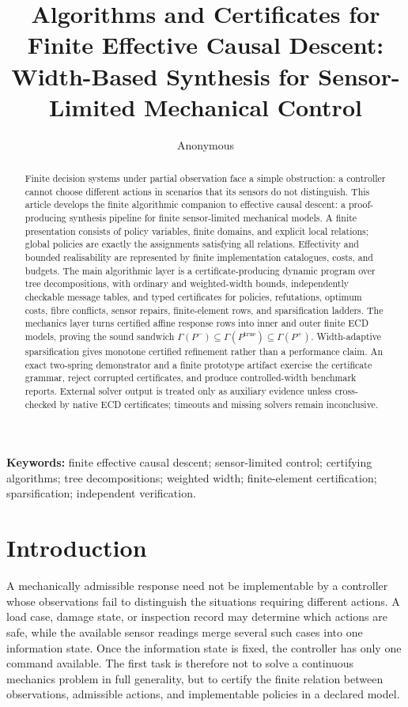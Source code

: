 \documentclass[11pt]{article}
\title{Algorithms and Certificates for Finite Effective Causal Descent:\\
Width-Based Synthesis for Sensor-Limited Mechanical Control}
\author{Anonymous}
\date{}
\theoremstyle{plain}
\theoremstyle{definition}
\theoremstyle{remark}
\begin{document}
\maketitle

\begin{abstract}
Finite decision systems under partial observation face a simple obstruction: a
controller cannot choose different actions in scenarios that its sensors do not
distinguish.  This article develops the finite algorithmic companion to
effective causal descent: a proof-producing synthesis pipeline for finite
sensor-limited mechanical models.  A finite presentation consists of policy variables, finite domains, and
explicit local relations; global policies are exactly the assignments satisfying
all relations.  Effectivity and bounded realisability are represented by finite
implementation catalogues, costs, and budgets.  The main algorithmic layer is a
certificate-producing dynamic program over tree decompositions, with ordinary
and weighted-width bounds, independently checkable message tables, and typed
certificates for policies, refutations, optimum costs, fibre conflicts, sensor
repairs, finite-element rows, and sparsification ladders.  The mechanics layer
turns certified affine response rows into inner and outer finite ECD models,
proving the sound sandwich
\(\Gamma(P^-)\subseteq\Gamma(P^{\mathrm{true}})\subseteq\Gamma(P^+)\).
Width-adaptive sparsification gives monotone certified refinement rather than a
performance claim.  An exact two-spring demonstrator and a finite prototype
artifact exercise the certificate grammar, reject corrupted certificates, and
produce controlled-width benchmark reports.  External solver output is treated
only as auxiliary evidence unless cross-checked by native ECD certificates;
timeouts and missing solvers remain inconclusive.
\end{abstract}

\noindent\textbf{Keywords:} finite effective causal descent; sensor-limited control;
certifying algorithms; tree decompositions; weighted width; finite-element
certification; sparsification; independent verification.

\tableofcontents

\section{Introduction}
\label{sec:introduction}

A mechanically admissible response need not be implementable by a controller
whose observations fail to distinguish the situations requiring different
actions.  A load case, damage state, or inspection record may determine which
actions are safe, while the available sensor readings merge several such cases
into one information state.  Once the information state is fixed, the controller
has only one command available.  The first task is therefore not to solve a
continuous mechanics problem in full generality, but to certify the finite
relation between observations, admissible actions, and implementable policies in
a declared model.
\end{document}
